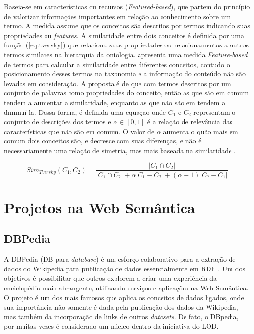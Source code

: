 Baseia-se em características ou recursos (\textit{Featured-based}), que partem do princípio de valorizar informações importantes em relação ao conhecimento sobre um termo. A medida assume que os conceitos são descritos por termos indicando suas propriedades ou \textit{features}. A similaridade entre dois conceitos é definida por uma função (\ref{eq:tversky}) que relaciona suas propriedades ou relacionamentos a outros termos similares na hierarquia da ontologia. \cite{Tversky:1977} apresenta uma medida \textit{Feature-based} de termos para calcular a similaridade entre diferentes conceitos, contudo o posicionamento desses termos na taxonomia e a informação do conteúdo não são levadas em consideração. A proposta é de que com termos descritos por um conjunto de palavras como propriedades do conceito, então as que são em comum tendem a aumentar a similaridade, enquanto as que não são em tendem a diminuí-la. Dessa forma, é definida uma equação onde $C_1$ e $C_2$ representam o conjunto de descrições dos termos e $\alpha \in [0,1]$ é a relação de relevância das características que não são em comum. O valor de $\alpha$ aumenta o quão mais em comum dois conceitos são, e decresce com suas diferenças, e não é necessariamente uma relação de simetria, mas mais baseada na similaridade \citep{Slimani2013}.

\begin{equation}
	Sim_{Tversky}(C_1, C_2) = \frac{ |C_1 \cap C_2| }
	{ |C_1 \cap C_2| + \alpha |C_1 - C_2| + (\alpha - 1)|C_2 - C_1| }
\label{eq:tversky}
\end{equation}

\section{Projetos na Web Semântica}

\subsection{DBPedia}

A DBPedia (DB para \textit{database}) é um esforço colaborativo para a extração de dados do Wikipedia para publicação de dados essencialmente em RDF \citep{Auer:2007:DNW:1785162.1785216}. Um dos objetivos é possibilitar que outros explorem a criar uma experiência da enciclopédia mais abrangente, utilizando serviços e aplicações na Web Semântica. O projeto é um dos mais famosos que aplica os conceitos de dados ligados, onde sua importância não somente é dada pela publicação dos dados da Wikipedia, mas também da incorporação de links de outros \textit{datasets}. De fato, o DBpedia, por muitas vezes é considerado um núcleo dentro da iniciativa do LOD.

